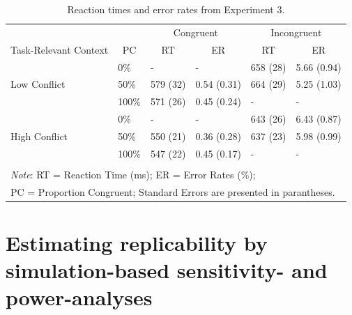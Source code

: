 \documentclass[english,,man,floatsintext]{apa6}
\begin{document}
\begin{table}[htbp]
\centering
\begin{threeparttable}
\caption{Reaction times and error rates from Experiment 3.}
\label{TR_table_3}
\centering
\begin{tabular}{llcccc}
\toprule
& & \multicolumn{2}{c}{Congruent} & \multicolumn{2}{c}{Incongruent} \\
\cmidrule(rl){3-4}
\cmidrule(rl){5-6}
\multicolumn{1}{c}{Task-Relevant Context} & \multicolumn{1}{c}{PC} & \multicolumn{1}{c}{RT} & \multicolumn{1}{c}{ER} & \multicolumn{1}{c}{RT} & \multicolumn{1}{c}{ER}  \\
\midrule
\multirow{3}{*}{Low Conflict} & \multicolumn{1}{l}{0\%} & \multicolumn{1}{l}{-} & \multicolumn{1}{l}{-} & \multicolumn{1}{l}{658 (28)} & \multicolumn{1}{l}{5.66 (0.94)} \\
& \multicolumn{1}{l}{50\%} & \multicolumn{1}{l}{579 (32)} & \multicolumn{1}{l}{0.54 (0.31)} & \multicolumn{1}{l}{664 (29)} & \multicolumn{1}{l}{5.25 (1.03)} \\
& \multicolumn{1}{l}{100\%} & \multicolumn{1}{l}{571 (26)} & \multicolumn{1}{l}{0.45 (0.24)} & \multicolumn{1}{l}{-} & \multicolumn{1}{l}{-} \\
\midrule
\multirow{3}{*}{High Conflict} & \multicolumn{1}{l}{0\%} & \multicolumn{1}{l}{-} & \multicolumn{1}{l}{-} & \multicolumn{1}{l}{643 (26)} & \multicolumn{1}{l}{6.43 (0.87)} \\
& \multicolumn{1}{l}{50\%} & \multicolumn{1}{l}{550 (21)} & \multicolumn{1}{l}{0.36 (0.28)} & \multicolumn{1}{l}{637 (23)} & \multicolumn{1}{l}{5.98 (0.99)} \\
& \multicolumn{1}{l}{100\%} & \multicolumn{1}{l}{547 (22)} & \multicolumn{1}{l}{0.45 (0.17)} & \multicolumn{1}{l}{-} & \multicolumn{1}{l}{-} \\
 & & & & & \\
\bottomrule
\multicolumn{6}{l}{\textit{Note}: RT = Reaction Time (ms);  ER = Error Rates (\%);} \\
\multicolumn{6}{l}{PC = Proportion Congruent; Standard Errors are presented in parantheses.} \\
\end{tabular}%
\end{threeparttable}
\end{table}

\hypertarget{estimating-replicability-by-simulation-based-sensitivity--and-power-analyses}{%
\section{Estimating replicability by simulation-based sensitivity- and power-analyses}\label{estimating-replicability-by-simulation-based-sensitivity--and-power-analyses}}
\end{document}
